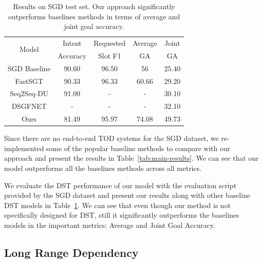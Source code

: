 \begin{table}
    \begin{adjustbox}{max width=0.45\textwidth}
        \begin{tabular}{|c|c|c|c|c|}
            \hline
            \multirow{2}{*}{Model} & Intent   & Requested & Average & Joint \\
                                   & Accuracy & Slot F1   & GA      & GA    \\ \hline
            SGD Baseline           & 90.60    & 96.50     & 56      & 25.40 \\ \hline
            FastSGT                & 90.33    & 96.33     & 60.66   & 29.20 \\ \hline
            Seq2Seq-DU             & 91.00    & -         & -       & 30.10 \\ \hline
            DSGFNET                & -        & -         & -       & 32.10 \\ \hline
            Ours                   & 81.49    & 95.97     & 74.08   & 49.73 \\ \hline
        \end{tabular}
    \end{adjustbox}
    \caption{Results on SGD test set. Our approach significantly outperforms baselines methods in terms of average and joint goal accuracy.}
    \label{tab:other-results}
\end{table}

Since there are no end-to-end TOD systems for the SGD dataset, we re-implemented some of the popular baseline methods to
compare with our approach and present the results in Table~\ref{tab:main-results}. We can see that our model outperforms all the
baselines methods across all metrics.

We evaluate the DST performance of our model with the evaluation script provided by the SGD dataset and present our results along
with other baseline DST models in Table~\ref{tab:other-results}.
We can see that even though our method is not specifically designed for DST, still it significantly outperforms the baselines models in the
important metrics: Average and Joint Goal Accuracy.

\subsection{Long Range Dependency}

